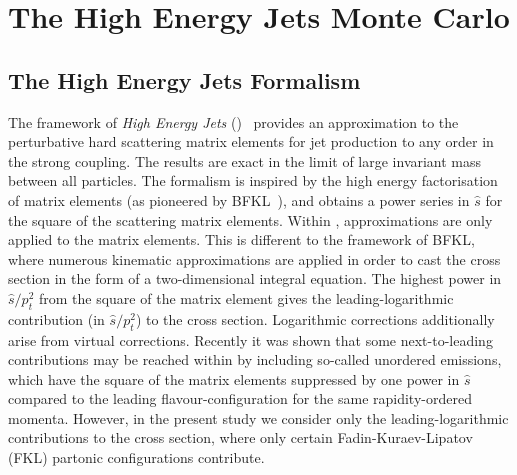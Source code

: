 \section{The High Energy Jets Monte Carlo}
\label{sec:hej}

\subsection{The High Energy Jets Formalism}
\label{sec:hejformalism}
The framework of \emph{High Energy Jets} (\HEJ)~\cite{Andersen:2009nu,Andersen:2009he,Andersen:2011hs} provides an
approximation to the perturbative hard scattering matrix
elements for jet production to any order in the strong coupling. The results are
exact in the limit of large invariant mass between all particles. The
formalism is inspired by the high energy factorisation of matrix elements (as
pioneered by
BFKL~\cite{Fadin:1975cb,Kuraev:1976ge,Kuraev:1977fs,Balitsky:1978ic}), and
obtains a power series in $\hat s$ for the square of the scattering matrix
elements. 
Within \HEJ, approximations are only applied to the matrix elements. This is different to the framework
of BFKL, where numerous kinematic approximations are applied in order to cast
the cross section in the form of a two-dimensional integral equation.
The highest power in $\hat s/p_t^2$ from the square of the matrix element gives the leading-logarithmic
contribution (in $\hat s/p_t^2$) to the cross section. Logarithmic
corrections additionally arise from virtual corrections. Recently it was shown that 
some next-to-leading contributions may be reached within \HEJ \cite{Andersen:2017kfc} 
by including so-called unordered emissions, which have the square of the matrix elements suppressed by one
power in $\hat s$ compared to the leading flavour-configuration for the same
rapidity-ordered momenta. However, in the present study we consider only the leading-logarithmic
contributions to the cross section, where only certain Fadin-Kuraev-Lipatov~\cite{Kuraev:1976ge} 
(FKL) partonic configurations contribute. 


